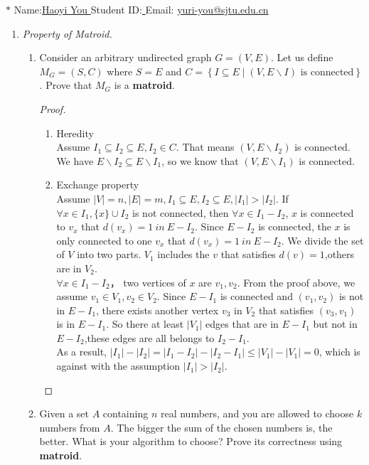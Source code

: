\documentclass[12pt,a4paper]{article}
\theoremstyle{definition}
\begin{document}
\noindent

\noindent{}
 
 \begin{center}
\footnotesize{\color{blue}$*$ Name:\underline{\quad   Haoyi You  \quad  }\quad Student ID:\underline{ \quad} \quad Email: \underline{\quad yuri-you@sjtu.edu.cn \quad}}
\end{center}

\begin{enumerate}
\item \textit{Property of Matroid.} 
\begin{enumerate}
	\item
	Consider an arbitrary undirected graph $ G=(V,E) $. Let us define $ M_{G}=(S,C) $ where $ S=E $ and $ C=\left\{I \subseteq E \mid\left(V, E \backslash I\right) \text { is connected}\right\} $. Prove that $ M_{G} $ is a \textbf{matroid}.\par
	    \begin{proof}~\par
	        \begin{enumerate}\item Heredity\\
	                Assume $I_1\subseteq I_2\subseteq E,I_2\in C$. That means $(V,E\backslash I_2)$ is connected. We have $E\backslash I_2 \subseteq E\backslash I_1$, so we know that  $(V,E\backslash I_1)$ is connected.
	            \item Exchange property\\
	            Assume $|V|=n,|E|=m, I_1\subseteq E,I_2\subseteq E,|I_1|>|I_2|$. If $\forall x\in I_1,\{x\}\cup I_2$ is not connected, then $\forall x\in I_1-I_2$, $x$ is connected to $v_x$ that $d(v_x)=1~in~E-I_2$. Since $E-I_2$ is connected, the $x$ is only connected to one $v_x$ that $d(v_x)=1~in~E-I_2$. We divide the set of $V$ into two parts. $V_1$ includes the $v$ that satisfies $d(v)=1$,others are in $V_2$.\\
	            $\forall x \in I_1-I_2$， two vertices of $x$ are $v_1,v_2$. From the proof above, we assume $v_1 \in V_1, v_2 \in V_2$. Since $E-I_1$ is connected and $(v_1,v_2)$ is not in $E-I_1$, there exists another vertex $v_3$ in $V_2$ that satisfies $(v_3,v_1)$ is in $E-I_1$. So there at least $|V_1|$ edges that are in $E-I_1$ but not in $E-I_2$,these edges are all belongs to $I_2-I_1$.\\As a result, $|I_1|-|I_2|=|I_1-I_2|-|I_2-I_1|\le |V_1|-|V_1|=0$, which is against with the assumption $|I_1|>|I_2|$.
	        \end{enumerate}
	    \end{proof}
	\item
	Given a set $A$ containing $n$ real numbers, and you are allowed to choose $k$ numbers from $A$. The bigger the sum of the chosen numbers is, the better. What is your algorithm to choose? Prove its correctness using \textbf{matroid}.\par


\end{enumerate}
\end{enumerate}
\end{document}
